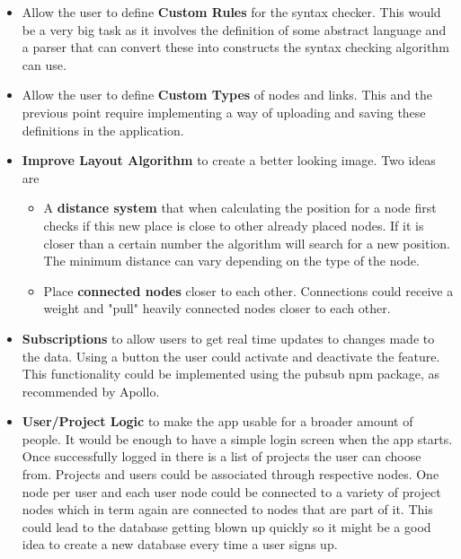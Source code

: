 \begin{itemize}
\item Allow the user to define \textbf{Custom Rules} for the syntax checker. This would be a very big task as it involves the definition of some abstract language and a parser that can convert these into constructs the syntax checking algorithm can use.

\item Allow the user to define \textbf{Custom Types} of nodes and links. This and the previous point require implementing a way of uploading and saving these definitions in the application.

\item \textbf{Improve Layout Algorithm} to create a better looking image. Two ideas are
\begin{itemize}
\item A \textbf{distance system} that when calculating the position for a node first checks if this new place is close to other already placed nodes. If it is closer than a certain number the algorithm will search for a new position. The minimum distance can vary depending on the type of the node.
\item Place \textbf{connected nodes} closer to each other. Connections could receive a weight and "pull" heavily connected nodes closer to each other.
\end{itemize}

\item \textbf{Subscriptions} to allow users to get real time updates to changes made to the data. Using a button the user could activate and deactivate the feature. This functionality could be implemented using the pubsub npm package, as recommended by Apollo.

\item \textbf{User/Project Logic} to make the app usable for a broader amount of people. It would be enough to have a simple login screen when the app starts. Once successfully logged in there is a list of projects the user can choose from. Projects and users could be associated through respective nodes. One node per user and each user node could be connected to a variety of project nodes which in term again are connected to nodes that are part of it. This could lead to the database getting blown up quickly so it might be a good idea to create a new database every time a user signs up.


\end{itemize}
